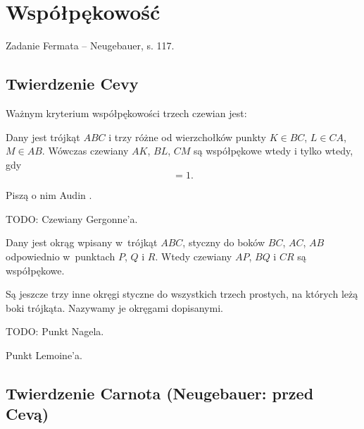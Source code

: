\section{Współpękowość}
Zadanie Fermata -- Neugebauer, s. 117.

\subsection{Twierdzenie Cevy}
Ważnym kryterium współpękowości trzech czewian jest:

\begin{proposition}
	Dany jest trójkąt $ABC$ i trzy różne od wierzchołków punkty $K \in BC$, $L \in CA$, $M \in AB$.
	Wówczas czewiany $AK$, $BL$, $CM$ są współpękowe wtedy i tylko wtedy, gdy
	\begin{equation}
		[AMB] [BKC] [CLA] = 1.
	\end{equation}
\end{proposition}

Piszą o nim Audin \cite[s. 38]{audin_2003}.

TODO: Czewiany Gergonne'a.

\begin{definition} %
%
	Dany jest okrąg wpisany w~trójkąt $ABC$, styczny do boków $BC$, $AC$, $AB$ odpowiednio w~punktach $P$, $Q$ i $R$.
	Wtedy czewiany $AP$, $BQ$ i $CR$ są współpękowe.
\end{definition}

Są jeszcze trzy inne okręgi styczne do wszystkich trzech prostych, na których leżą boki trójkąta.
Nazywamy je okręgami dopisanymi.

TODO: Punkt Nagela.



Punkt Lemoine'a.

\subsection{Twierdzenie Carnota (Neugebauer: przed Cevą)}


